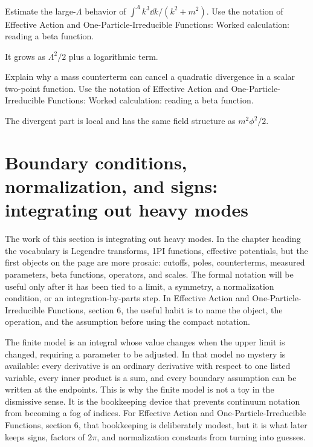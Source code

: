 \begin{exercise}
Estimate the large-\(\Lambda\) behavior of \(\int^\Lambda k^3\dd k/(k^2+m^2)\).  Use the notation of Effective Action and One-Particle-Irreducible Functions: Worked calculation: reading a beta function.
\begin{answer}
It grows as \(\Lambda^2/2\) plus a logarithmic term.
\end{answer}
\end{exercise}

\begin{exercise}
Explain why a mass counterterm can cancel a quadratic divergence in a scalar two-point function.  Use the notation of Effective Action and One-Particle-Irreducible Functions: Worked calculation: reading a beta function.
\begin{answer}
The divergent part is local and has the same field structure as \(m^2\phi^2/2\).
\end{answer}
\end{exercise}



\section{Boundary conditions, normalization, and signs: integrating out heavy modes}

The work of this section is integrating out heavy modes.  In the chapter heading the vocabulary is Legendre transforms, 1PI functions, effective potentials, but the first objects on the page are more prosaic: cutoffs, poles, counterterms, measured parameters, beta functions, operators, and scales.  The formal notation will be useful only after it has been tied to a limit, a symmetry, a normalization condition, or an integration-by-parts step.  In Effective Action and One-Particle-Irreducible Functions, section 6, the useful habit is to name the object, the operation, and the assumption before using the compact notation.

The finite model is an integral whose value changes when the upper limit is changed, requiring a parameter to be adjusted.  In that model no mystery is available: every derivative is an ordinary derivative with respect to one listed variable, every inner product is a sum, and every boundary assumption can be written at the endpoints.  This is why the finite model is not a toy in the dismissive sense.  It is the bookkeeping device that prevents continuum notation from becoming a fog of indices.  For Effective Action and One-Particle-Irreducible Functions, section 6, that bookkeeping is deliberately modest, but it is what later keeps signs, factors of \(2\pi\), and normalization constants from turning into guesses.

